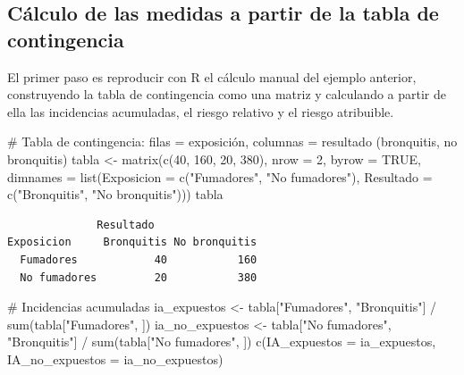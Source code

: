 \documentclass[
  spanish,
  a4paper,
]{scrreport}
\newenvironment{Shaded}{\begin{snugshade}}{\end{snugshade}}
\newcommand{\AttributeTok}[1]{\textcolor[rgb]{0.40,0.45,0.13}{#1}}
\newcommand{\CommentTok}[1]{\textcolor[rgb]{0.37,0.37,0.37}{#1}}
\newcommand{\ConstantTok}[1]{\textcolor[rgb]{0.56,0.35,0.01}{#1}}
\newcommand{\DecValTok}[1]{\textcolor[rgb]{0.68,0.00,0.00}{#1}}
\newcommand{\FunctionTok}[1]{\textcolor[rgb]{0.28,0.35,0.67}{#1}}
\newcommand{\NormalTok}[1]{\textcolor[rgb]{0.00,0.23,0.31}{#1}}
\newcommand{\OtherTok}[1]{\textcolor[rgb]{0.00,0.23,0.31}{#1}}
\newcommand{\SpecialCharTok}[1]{\textcolor[rgb]{0.37,0.37,0.37}{#1}}
\newcommand{\StringTok}[1]{\textcolor[rgb]{0.13,0.47,0.30}{#1}}
\theoremstyle{definition}
\theoremstyle{definition}
\theoremstyle{remark}
\begin{document}
\subsection{Cálculo de las medidas a partir de la tabla de
contingencia}\label{cuxe1lculo-de-las-medidas-a-partir-de-la-tabla-de-contingencia}

El primer paso es reproducir con R el cálculo manual del ejemplo
anterior, construyendo la tabla de contingencia como una matriz y
calculando a partir de ella las incidencias acumuladas, el riesgo
relativo y el riesgo atribuible.

\begin{Shaded}
\begin{Highlighting}[]
\CommentTok{\# Tabla de contingencia: filas = exposición, columnas = resultado (bronquitis, no bronquitis)}
\NormalTok{tabla }\OtherTok{\textless{}{-}} \FunctionTok{matrix}\NormalTok{(}\FunctionTok{c}\NormalTok{(}\DecValTok{40}\NormalTok{, }\DecValTok{160}\NormalTok{, }\DecValTok{20}\NormalTok{, }\DecValTok{380}\NormalTok{),}
                 \AttributeTok{nrow =} \DecValTok{2}\NormalTok{, }\AttributeTok{byrow =} \ConstantTok{TRUE}\NormalTok{,}
                 \AttributeTok{dimnames =} \FunctionTok{list}\NormalTok{(}\AttributeTok{Exposicion =} \FunctionTok{c}\NormalTok{(}\StringTok{"Fumadores"}\NormalTok{, }\StringTok{"No fumadores"}\NormalTok{),}
                                  \AttributeTok{Resultado =} \FunctionTok{c}\NormalTok{(}\StringTok{"Bronquitis"}\NormalTok{, }\StringTok{"No bronquitis"}\NormalTok{)))}
\NormalTok{tabla}
\end{Highlighting}
\end{Shaded}

\begin{verbatim}
              Resultado
Exposicion     Bronquitis No bronquitis
  Fumadores            40           160
  No fumadores         20           380
\end{verbatim}

\begin{Shaded}
\begin{Highlighting}[]
\CommentTok{\# Incidencias acumuladas}
\NormalTok{ia\_expuestos }\OtherTok{\textless{}{-}}\NormalTok{ tabla[}\StringTok{"Fumadores"}\NormalTok{, }\StringTok{"Bronquitis"}\NormalTok{] }\SpecialCharTok{/} \FunctionTok{sum}\NormalTok{(tabla[}\StringTok{"Fumadores"}\NormalTok{, ])}
\NormalTok{ia\_no\_expuestos }\OtherTok{\textless{}{-}}\NormalTok{ tabla[}\StringTok{"No fumadores"}\NormalTok{, }\StringTok{"Bronquitis"}\NormalTok{] }\SpecialCharTok{/} \FunctionTok{sum}\NormalTok{(tabla[}\StringTok{"No fumadores"}\NormalTok{, ])}
\FunctionTok{c}\NormalTok{(}\AttributeTok{IA\_expuestos =}\NormalTok{ ia\_expuestos, }\AttributeTok{IA\_no\_expuestos =}\NormalTok{ ia\_no\_expuestos)}
\end{Highlighting}
\end{Shaded}
\end{document}
